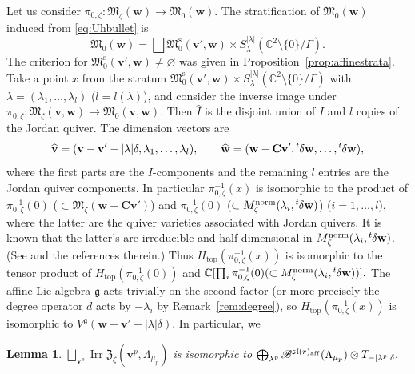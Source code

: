 \documentclass[10pt,a4paper]{amsart}
\newtheorem{Lemma}[equation]{Lemma}
\theoremstyle{definition}
\numberwithin{equation}{section}
\newcommand{\propref}[1]{Proposition~\ref{#1}}
\newcommand{\remref}[1]{Remark~\ref{#1}}
\newcommand{\lsp}[2]{{\mskip-.3mu}{}^{#1}\mskip-1mu{#2}}
\newcommand{\C}{{\mathbb C}}
\newcommand{\algsl}{\operatorname{\mathfrak{sl}}} %
\newcommand{\g}{{\mathfrak g}}
\newcommand{\M}{{\mathfrak M}} %
\newcommand{\Mreg}{\M^{\operatorname{s}}}
\newcommand{\bv}{{\mathbf v}} %
\newcommand{\bw}{{\mathbf w}} %
\newcommand{\bC}{{\mathbf C}} %
\newcommand{\topdeg}{{\operatorname{top}}} %
\newcommand{\Irr}{\operatorname{Irr}}
\newcommand{\aff}{\mathrm{af\/f}}
\begin{document}
Let us consider $\pi_{0,\zeta}\colon \M_\zeta(\bw) \to \M_0(\bw)$.
The stratif\/ication of $\M_0(\bw)$ induced from \eqref{eq:Uhbullet} is
\begin{equation}\label{eq:0stratum}
   \M_0(\bw) = \bigsqcup \Mreg_0(\bv',\bw)\times
   S^{|\lambda|}_\lambda(\C^2\setminus\{0\}/\Gamma).
\end{equation}
The criterion for $\Mreg_0(\bv',\bw)\neq\varnothing$ was given in
\propref{prop:affinestrata}.
%
Take a point $x$ from the stratum $\Mreg_0(\bv',\bw)\times
S^{|\lambda|}_\lambda(\C^2\setminus\{0\}/\Gamma)$ with $\lambda =
(\lambda_1,\dots, \lambda_l)$ ($l=l(\lambda)$), and consider the
inverse image under $\pi_{0,\zeta}\colon \M_\zeta(\bv,\bw)\to
\M_0(\bv,\bw)$.
Then $\widehat{I}$ is the disjoint union of $I$ and $l$ copies of the
Jordan quiver. The dimension vectors are
\begin{equation*}
  \widehat{\bv} = (\bv - \bv' - |\lambda|\delta,
  \lambda_1,\dots,\lambda_l),
\qquad
  \widehat{\bw} = (\bw - \bC\bv',
  \lsp{t}{\delta}{\bw},\dots,\lsp{t}{\delta}{\bw}),
\end{equation*}
where the f\/irst parts are the $I$-components and the remaining $l$
entries are the Jordan quiver components. In particular
$\pi_{0,\zeta}^{-1}(x)$ is isomorphic to the product of
$\pi_{0,\zeta}^{-1}(0)$ ($\subset\M_\zeta(\bw-\bC\bv')$) and
$\pi_{0,\zeta}^{-1}(0)$ ($\subset
M_\zeta^{\text{norm}}(\lambda_i,\lsp{t}{\delta}\bw)$) ($i=1,\dots, l$),
where the latter are the quiver varieties associa\-ted with Jordan
quivers. It is known that the latter's are irreducible and
half-dimensional in
$M_\zeta^{\text{norm}}(\lambda_i,\lsp{t}{\delta}\bw)$. (See
\cite[Exercise~5.15]{Lecture} and the references therein.)  Thus
$H_{\topdeg}(\pi^{-1}_{0,\zeta}(x))$ is isomorphic to the tensor
product of $H_{\topdeg}(\pi^{-1}_{0,\zeta}(0))$ and
\(
   \C[\prod_i \pi_{0,\zeta}^{-1}(0)(\subset
   M_\zeta^{\text{norm}}(\lambda_i,\lsp{t}{\delta}\bw))].
\)
The af\/f\/ine Lie algebra $\g$ acts trivially on the second factor (or
more precisely the degree operator $d$ acts by $-\lambda_i$ by
\remref{rem:degree}), so $H_{\topdeg}(\pi^{-1}_{0,\zeta}(x))$ is
isomorphic to $V^\g(\bw - \bv' - |\lambda|\delta)$. In particular, we

\begin{Lemma}\label{lem:Fock}
\(
   \bigsqcup_{\bv^p} \Irr\mathfrak Z_\zeta(\bv^p,\Lambda_{\mu_p})
\)
is isomorphic to
\(
  \bigoplus_{\lambda^p}
  \mathscr B^{{\algsl}(r)_\aff}(\Lambda_{\mu_p})
  \otimes T_{-|\lambda^p|\delta}.
\)
\end{Lemma}
\end{document}
